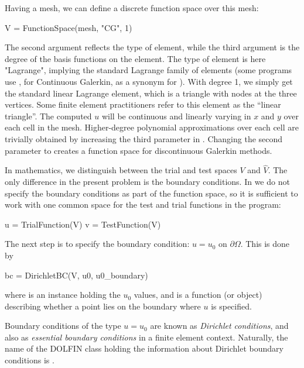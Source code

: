Having a mesh, we can define a discrete function space  over this
mesh: 
\begin{python}
  V = FunctionSpace(mesh, "CG", 1)
\end{python}
The second argument reflects the type of element, while the third
argument is the degree of the basis functions on the element.
The type of element is here "Lagrange", implying the
standard Lagrange family of elements (some \fenics{} programs use , for Continuous Galerkin, as a synonym for ).
With degree 1, we simply get the standard linear
Lagrange element, which is a triangle with nodes at the three
vertices.  Some finite element practitioners refer to this element as
the ``linear triangle''.  The computed $u$ will be continuous and
linearly varying in $x$ and $y$ over each cell in the mesh.
Higher-degree polynomial approximations over each cell are trivially
obtained by increasing the third parameter in
. Changing the second parameter to 
creates a function space for discontinuous Galerkin methods.

In mathematics, we distinguish between the trial and test spaces $V$
and $\hat{V}$. The only difference in the present problem is the
boundary conditions. In \fenics{} we do not specify the boundary
conditions as part of the function space, so it is sufficient to work
with one common space  for the test and trial functions in the
program:
\begin{python}
u = TrialFunction(V)
v = TestFunction(V)
\end{python}

The next step is to specify the boundary condition:
$u=u_0$ on $\partial\Omega$. This is done
by
\begin{python}
bc = DirichletBC(V, u0, u0_boundary)
\end{python}
where  is an instance holding the $u_0$ values, and
 is a function (or object) describing whether a point
lies on the boundary where $u$ is specified.

Boundary conditions of the type $u=u_0$ are known as \emph{Dirichlet
conditions}, and also as \emph{essential boundary conditions} in a finite
element context.  Naturally, the name of the DOLFIN class holding the
information about Dirichlet boundary conditions is .

